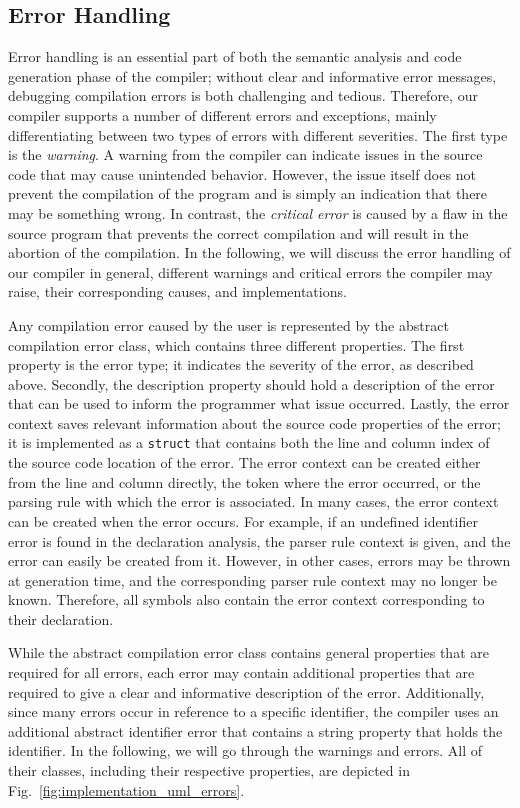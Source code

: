 \subsection{Error Handling}
\label{sec:implementation_compiler_errorHandling}
Error handling is an essential part of both the semantic analysis and code generation phase of the compiler; without clear and informative error messages, debugging compilation errors is both challenging and tedious. 
Therefore, our compiler supports a number of different errors and exceptions, mainly differentiating between two types of errors with different severities. The first type is the \emph{warning}. A warning from the compiler can indicate issues in the source code that may cause unintended behavior. However, the issue itself does not prevent the compilation of the program and is simply an indication that there may be something wrong. In contrast, the \emph{critical error} is caused by a flaw in the source program that prevents the correct compilation and will result in the abortion of the compilation. In the following, we will discuss the error handling of our compiler in general, different warnings and critical errors the compiler may raise, their corresponding causes, and implementations.

Any compilation error caused by the user is represented by the abstract compilation error class, which contains three different properties. The first property is the error type; it indicates the severity of the error, as described above. Secondly, the description property should hold a description of the error that can be used to inform the programmer what issue occurred. Lastly, the error context saves relevant information about the source code properties of the error; it is implemented as a \texttt{struct} that contains both the line and column index of the source code location of the error. The error context can be created either from the line and column directly, the token where the error occurred, or the parsing rule with which the error is associated. In many cases, the error context can be created when the error occurs. For example, if an undefined identifier error is found in the declaration analysis, the parser rule context is given, and the error can easily be created from it. However, in other cases, errors may be thrown at generation time, and the corresponding parser rule context may no longer be known. Therefore, all symbols also contain the error context corresponding to their declaration.

While the abstract compilation error class contains general properties that are required for all errors, each error may contain additional properties that are required to give a clear and informative description of the error. Additionally, since many errors occur in reference to a specific identifier, the compiler uses an additional abstract identifier error that contains a string property that holds the identifier. In the following, we will go through the warnings and errors. All of their classes, including their respective properties, are depicted in Fig.~\ref{fig:implementation_uml_errors}.

